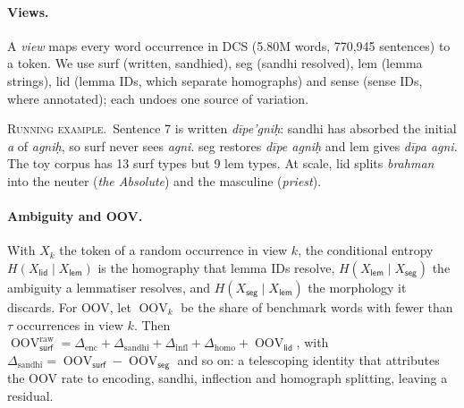 \documentclass[11pt]{article}
\newcommand{\vk}[1]{\textsf{#1}}
\newcommand{\OOV}{\operatorname{OOV}}
\newcommand{\ex}{\par\smallskip\noindent\textsc{Running example.}~}
\begin{document}
\paragraph{Views.} A \emph{view} maps every word occurrence in DCS
(5.80M words, 770,945 sentences) to a token. We use \vk{surf} (written,
sandhied), \vk{seg} (sandhi resolved), \vk{lem} (lemma strings), \vk{lid}
(lemma IDs, which separate homographs) and \vk{sense} (sense IDs, where
annotated); each undoes one source of variation.

\ex Sentence 7 is written \emph{dīpe'gniḥ}: sandhi has absorbed the initial
\emph{a} of \emph{agniḥ}, so \vk{surf} never sees \emph{agni}. \vk{seg}
restores \emph{dīpe agniḥ} and \vk{lem} gives \emph{dīpa agni}. The toy
corpus has 13 \vk{surf} types but 9 \vk{lem} types. At scale, \vk{lid}
splits \emph{brahman} into the neuter (\emph{the Absolute}) and the
masculine (\emph{priest}).

\paragraph{Ambiguity and OOV.} With $X_k$ the token of a random occurrence
in view $k$, the conditional entropy $H(X_{\vk{lid}}\mid X_{\vk{lem}})$ is
the homography that lemma IDs resolve, $H(X_{\vk{lem}}\mid X_{\vk{seg}})$
the ambiguity a lemmatiser resolves, and $H(X_{\vk{seg}}\mid X_{\vk{lem}})$
the morphology it discards. For OOV, let $\OOV_k$ be the share of benchmark
words with fewer than $\tau$ occurrences in view $k$. Then
$\OOV^{\mathrm{raw}}_{\vk{surf}}=\Delta_{\mathrm{enc}}+\Delta_{\mathrm{sandhi}}
+\Delta_{\mathrm{infl}}+\Delta_{\mathrm{homo}}+\OOV_{\vk{lid}}$, with
$\Delta_{\mathrm{sandhi}}=\OOV_{\vk{surf}}-\OOV_{\vk{seg}}$ and so on: a
telescoping identity that attributes the OOV rate to encoding, sandhi,
inflection and homograph splitting, leaving a residual.
\end{document}
